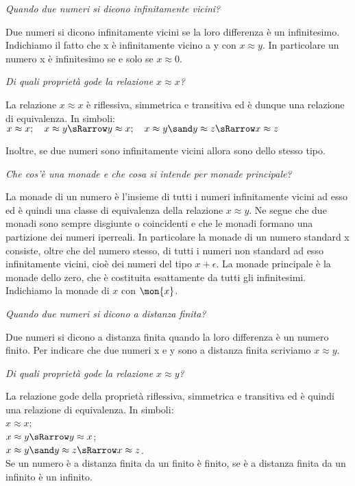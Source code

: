 \begin{esercizio}\label{ese:iper_018} 
\emph{Quando due numeri si dicono infinitamente vicini?}

Due numeri si dicono infinitamente vicini se la loro differenza è un 
infinitesimo. Indichiamo il fatto che x è infinitamente vicino a y con 
\(x \approx y\). 
In particolare un numero x è infinitesimo se e solo se \(x \approx 0\).
\end{esercizio}

\begin{esercizio}\label{ese:iper_019} 
\emph{Di quali proprietà gode la relazione \(x \approx x\)?}

La relazione \(x \approx x\) è riflessiva, simmetrica e transitiva ed è 
dunque una relazione di equivalenza. In simboli:\\
\(x \approx x; \quad 
  x \approx y \sRarrow y \approx x; \quad
  x \approx y \sand y \approx z \sRarrow x \approx z\)
  
Inoltre, se due numeri sono infinitamente vicini allora sono dello stesso 
tipo.
\end{esercizio}

\begin{esercizio}\label{ese:iper_020} 
\emph{Che cos'è una monade e che cosa si intende per monade principale?}

La monade di un numero è l'insieme di tutti i numeri infinitamente vicini 
ad esso ed è quindi una classe di equivalenza della relazione 
\(x \approx y\). 
Ne segue che due monadi sono sempre disgiunte o coincidenti e che le 
monadi formano una partizione dei numeri iperreali. 
In particolare la monade di un numero standard x consiste, oltre che del 
numero stesso, di tutti i numeri non standard ad esso infinitamente vicini, 
cioè dei numeri del tipo \(x + \epsilon\). 
La monade principale è la monade dello zero, che è costituita esattamente da 
tutti gli infinitesimi. Indichiamo la monade di \(x\) con \(\mon{x}\).
\end{esercizio}

\begin{esercizio}\label{ese:iper_021} 
\emph{Quando due numeri si dicono a distanza finita?}

Due numeri si dicono a distanza finita quando la loro differenza è un 
numero finito. 
Per indicare che due numeri x e y sono a distanza finita scriviamo 
\(x \approx y\).
\end{esercizio}

\begin{esercizio}\label{ese:iper_022} 
\emph{Di quali proprietà gode la relazione \(x \approx y\)?}

La relazione gode della proprietà riflessiva, simmetrica e transitiva ed è 
quindi una relazione di equivalenza. In simboli:\\
\(x \approx x\);\\
\(x \approx y \sRarrow y \approx x\);\\
\(x \approx y \sand y \approx z \sRarrow x \approx z\).\\
Se un numero è a distanza finita da un finito è finito, se è a distanza 
finita da un infinito è un infinito.
\end{esercizio}

